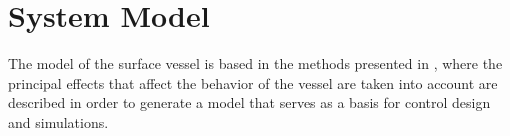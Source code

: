 \chapter{System Model} \label{chap:model}
The model of the surface vessel is based in the methods presented in \cite{TFossen}, where the principal effects that affect the behavior of the vessel are taken into account are described in order to generate a model that serves as a basis for control design and simulations.


